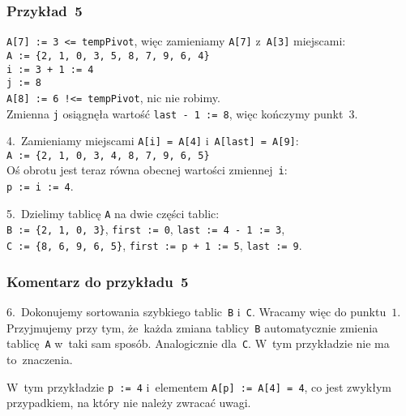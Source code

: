 \documentclass[10pt,t]{beamer}
\begin{document}
\begin{frame}
  \frametitle{Przykład~5}


  \texttt{A[7] := 3 <= tempPivot}, więc zamieniamy \texttt{A[7]}
  z~\texttt{A[3]} miejscami: \\
  \texttt{A := \{2, 1, 0, 3, 5, 8, 7, 9, 6, 4\} } \\
  \texttt{i := 3 + 1 := 4} \\
  \texttt{j := 8} \\
  \texttt{A[8] := 6 !<= tempPivot}, nic nie robimy. \\
  Zmienna \texttt{j} osiągnęła wartość \texttt{last - 1 := 8}, więc
  kończymy punkt~$3$.

  4.~Zamieniamy miejscami \texttt{A[i] = A[4]} i~\texttt{A[last] = A[9]}: \\
  \texttt{A := \{2, 1, 0, 3, 4, 8, 7, 9, 6, 5\}} \\
  Oś obrotu jest teraz równa obecnej wartości zmiennej~\texttt{i}: \\
  \texttt{p := i := 4}.

  5.~Dzielimy tablicę \texttt{A} na dwie części tablic: \\
  \texttt{B := \{2, 1, 0, 3\}}, \texttt{first := 0},
  \texttt{last := 4 - 1 := 3}, \\
  \texttt{C := \{8, 6, 9, 6, 5\}}, \texttt{first := p + 1 := 5},
  \texttt{last := 9}.

\end{frame}





\begin{frame}
  \frametitle{Komentarz do przykładu~5}


  6.~Dokonujemy sortowania szybkiego tablic~\texttt{B} i~\texttt{C}.
  Wracamy więc do punktu~$1$. Przyjmujemy przy tym, że~każda zmiana
  tablicy~\texttt{B} automatycznie zmienia tablicę~\texttt{A} w~taki
  sam sposób. Analogicznie dla~\texttt{C}. W~tym przykładzie nie ma
  to~znaczenia.



  W~tym przykładzie \texttt{p := 4} i~elementem \texttt{A[p] := A[4] = 4},
  co jest zwykłym przypadkiem, na który nie należy zwracać uwagi.

\end{frame}
\end{document}
